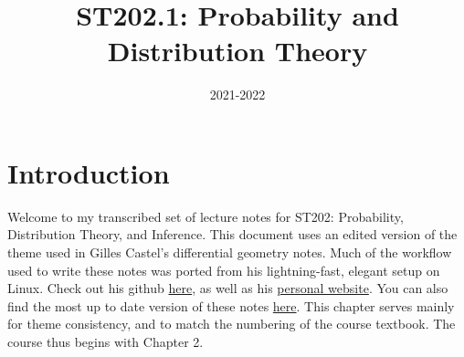 \documentclass[a4paper]{report}
\title{\Huge\textsf{ST202.1: Probability and Distribution Theory}}
\affil{\vskip.5cm\textsf{The London School of Economics and Political Science}}
\date{\textsf{2021-2022}}
\begin{document}
    \maketitle
    \tableofcontents
	\clearpage
\chapter{Introduction}
Welcome to my transcribed set of lecture notes for ST202: Probability, Distribution Theory, and Inference. This document uses an edited version of the theme used in Gilles Castel's differential geometry notes. Much of the workflow used to write these notes was ported from his lightning-fast, elegant setup on Linux. Check out his github \href{https://github.com/gillescastel}{here}, as well as his \href{https://castel.dev/}{personal website}. You can also find the most up to date version of these notes \href{https://github.com/meshkinyar}{here}. This chapter serves mainly for theme consistency, and to match the numbering of the course textbook. The course thus begins with Chapter 2.
    
    
    
    
    
    
    
    
    
    
    
    
    
    
    
    
    
    
    
    
    
\end{document}
